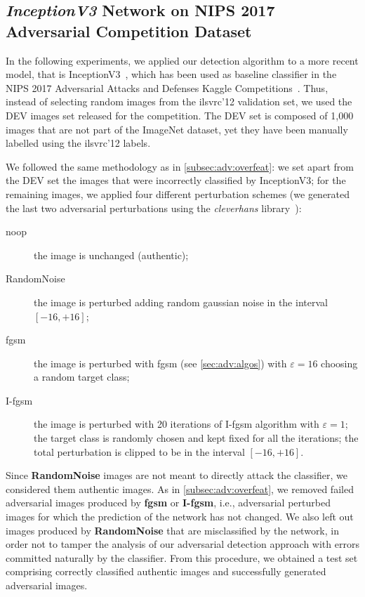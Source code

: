 \subsection{\emph{InceptionV3} Network on NIPS 2017 Adversarial Competition Dataset}
\label{subsec:adv:inception}

In the following experiments, we applied our detection algorithm to a more recent model, that is InceptionV3~\cite{szegedy2016rethinking}, which has been used as baseline classifier in the NIPS 2017 Adversarial Attacks and Defenses Kaggle Competitions~\cite{kurakin2018adversarial}.
Thus, instead of selecting random images from the \gls{ilsvrc}'12 validation set, we used the DEV images set released for the competition.
The DEV set is composed of 1,000 images that are not part of the ImageNet dataset, yet they have been manually labelled using the \gls{ilsvrc}'12 labels.

We followed the same methodology as in \ref{subsec:adv:overfeat}: we set apart from the DEV set the images that were incorrectly classified by InceptionV3; for the remaining images, we applied four different perturbation schemes (we generated the last two adversarial perturbations using the \emph{cleverhans} library~\cite{papernot2018cleverhans}):

\begin{description}%
  \item[noop] the image is unchanged (authentic);
  \item[RandomNoise] the image is perturbed adding random gaussian noise in the interval $[-16, +16]$;
  \item[\gls{fgsm}] the image is perturbed with \gls{fgsm} (see \ref{sec:adv:algos}) with $\varepsilon = 16$ choosing a random target class;
  \item[I-\gls{fgsm}] the image is perturbed with 20 iterations of I-\gls{fgsm} algorithm with $\varepsilon = 1$; the target class is randomly chosen and kept fixed for all the iterations; the total perturbation is clipped to be in the interval $[-16, +16]$.
\end{description}

Since \textbf{RandomNoise} images are not meant to directly attack the classifier, we considered them authentic images. %
As in \ref{subsec:adv:overfeat}, we removed failed adversarial images produced by \textbf{\gls{fgsm}} or \textbf{I-\gls{fgsm}}, i.e., adversarial perturbed images for which the prediction of the network has not changed.
We also left out images produced by \textbf{RandomNoise} that are misclassified by the network, in order not to tamper the analysis of our adversarial detection approach with errors committed naturally by the classifier.
From this procedure, we obtained a test set comprising correctly classified authentic images and successfully generated adversarial images.


